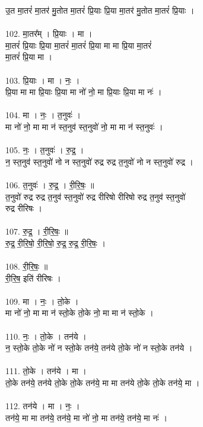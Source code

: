 उ॒त मा॒तरं॑ मा॒तर॑ मु॒तोत मा॒तरं॑ प्रि॒याः प्रि॒या मा॒तर॑ मु॒तोत मा॒तरं॑ प्रि॒याः ।\\
\\
102. मा॒तर᳚म् । प्रि॒याः । मा ।\\
मा॒तरं॑ प्रि॒याः प्रि॒या मा॒तरं॑ मा॒तरं॑ प्रि॒या मा मा प्रि॒या मा॒तरं॑\\
मा॒तरं॑ प्रि॒या मा ।\\
\\
103. प्रि॒याः । मा । नः॒ ।\\
प्रि॒या मा मा प्रि॒याः प्रि॒या मा नो॑ नो॒ मा प्रि॒याः प्रि॒या मा नः॑ ।\\
\\
104. मा । नः॒ । त॒नुवः॑ ।\\
मा नो॑ नो॒ मा मा न॑ स्त॒नुव॑ स्त॒नुवो॑ नो॒ मा मा न॑ स्त॒नुवः॑ ।\\
\\
105. नः॒ । त॒नुवः॑ । रु॒द्र॒ ।\\
न॒ स्त॒नुव॑ स्त॒नुवो॑ नो न स्त॒नुवो॑ रुद्र रुद्र त॒नुवो॑ नो न स्त॒नुवो॑ रुद्र ।\\
\\
106. त॒नुवः॑ । रु॒द्र॒ । री॒रि॒षः॒ ॥\\
त॒नुवो॑ रुद्र रुद्र त॒नुव॑ स्त॒नुवो॑ रुद्र रीरिषो रीरिषो रुद्र त॒नुव॑ स्त॒नुवो॑\\
रुद्र रीरिषः ।\\
\\
107. रु॒द्र॒ । री॒रि॒षः॒ ॥\\
रु॒द्र॒ री॒रि॒षो॒ री॒रि॒षो॒ रु॒द्र॒ रु॒द्र॒ री॒रि॒षः॒ ।\\
\\
108. री॒रि॒षः॒ ॥\\
री॒रि॒ष॒ इति॑ रीरिषः ।\\
\\
109. मा । नः॒ । तो॒के ।\\
मा नो॑ नो॒ मा मा न॑ स्तो॒के तो॒के नो॒ मा मा न॑ स्तो॒के ।\\
\\
110. नः॒ । तो॒के । तन॑ये ।\\
न॒ स्तो॒के तो॒के नो॑ न स्तो॒के तन॑ये॒ तन॑ये तो॒के नो॑ न स्तो॒के तन॑ये ।\\
\\
111. तो॒के । तन॑ये । मा ।\\
तो॒के तन॑ये॒ तन॑ये तो॒के तो॒के तन॑ये॒ मा मा तन॑ये तो॒के तो॒के तन॑ये॒ मा ।\\
\\
112. तन॑ये । मा । नः॒ ।\\
तन॑ये॒ मा मा तन॑ये॒ तन॑ये॒ मा नो॑ नो॒ मा तन॑ये॒ तन॑ये॒ मा नः॑ ।\\
